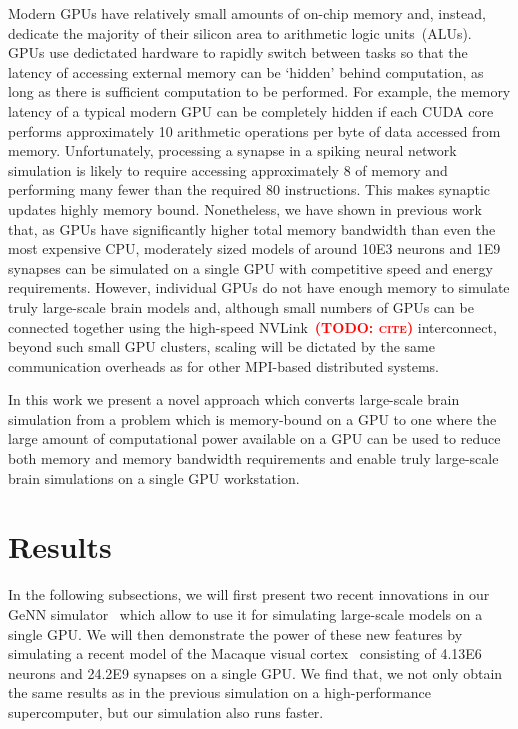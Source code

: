 \documentclass[9pt,twocolumn,twoside,lineno]{pnas-new}
\newcommand{\todo}[1]{\textbf{\textsc{\textcolor{red}{(TODO: #1)}}}}
\begin{document}
Modern GPUs have relatively small amounts of on-chip memory and, instead, dedicate the majority of their silicon area to arithmetic logic units~(ALUs).
GPUs use dedictated hardware to rapidly switch between tasks so that the latency of accessing external memory can be `hidden' behind computation, as long as there is sufficient computation to be performed.
For example, the memory latency of a typical modern GPU can be completely hidden if each CUDA core performs approximately 10 arithmetic operations per byte of data accessed from memory.
Unfortunately, processing a synapse in a spiking neural network simulation is likely to require accessing approximately \SI{8}{\byte} of memory and performing many fewer than the required 80 instructions. This makes synaptic updates highly memory bound.
Nonetheless, we have shown in previous work~\citep{Knight2018} that, as GPUs have significantly higher total memory bandwidth than even the most expensive CPU, moderately sized models of around \num{10E3} neurons and \num{1E9} synapses can be simulated on a single GPU with competitive speed and energy requirements.
However, individual GPUs do not have enough memory to simulate truly large-scale brain models and, although small numbers of GPUs can be connected together using the high-speed NVLink~\todo{cite} interconnect, beyond such small GPU clusters, scaling will be dictated by the same communication overheads as for other MPI-based distributed systems.

In this work we present a novel approach which converts large-scale brain simulation from a problem which is memory-bound on a GPU to one where the large amount of computational power available on a GPU can be used to reduce both memory and memory bandwidth requirements and enable truly large-scale brain simulations on a single  GPU workstation.

\section*{Results}
In the following subsections, we will first present two recent innovations in our GeNN simulator~\citep{Yavuz2016} which allow to use it for simulating large-scale models on a single GPU.
We will then demonstrate the power of these new features by simulating a recent model of the Macaque visual cortex~\citep{Schmidt2018} consisting of \num{4.13E6} neurons and \num{24.2E9} synapses on a single GPU.
We find that, we not only obtain the same results as in the previous simulation on a high-performance supercomputer, but our simulation also runs faster.
\end{document}

